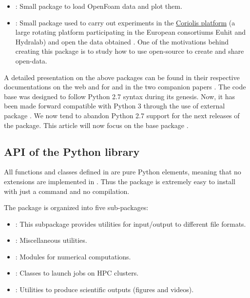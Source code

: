 \begin{itemize}
\item {}: Small package to load OpenFoam data and plot them.

\item {}: Small package used to carry out experiments in the
\href{http://www.legi.grenoble-inp.fr/web/spip.php?article757}{Coriolis platform}
(a large rotating platform participating in the European consortiums Euhit and
Hydralab) and open the data obtained \cite[see, for example,][]{ISSF2016}. One of
the motivations behind creating this package is to study how to use open-source to
create and share open-data.

\end{itemize}

A detailed presentation on the above packages can be found in their respective
documentations on the web and for  and  in the
two companion papers \cite[]{fluidfft, fluidsim}.
%
The code base was designed to follow Python 2.7 syntax during its genesis. Now,
it has been made forward compatible with Python 3 through the use of external
package .
%
We now tend to abandon Python 2.7 support for the next releases of the package.
%
This article will now focus on the base package \fluiddyn.

\subsection{API of the Python library \fluiddyn}

All functions and classes defined in \fluiddyn are pure Python elements, meaning
that no extensions are implemented in \fluiddyn.  Thus the package \fluiddyn is
extremely easy to install with just a  command and no
compilation.

The package \fluiddyn is organized into five sub-packages:
\begin{itemize}
\item {}: This subpackage provides utilities for
input/output to different file formats.
\item {}: Miscellaneous utilities.
\item {}: Modules for numerical computations.
\item {}: Classes to launch jobs on HPC clusters.
\item {}: Utilities to produce scientific outputs
(figures and videos).
\end{itemize}


